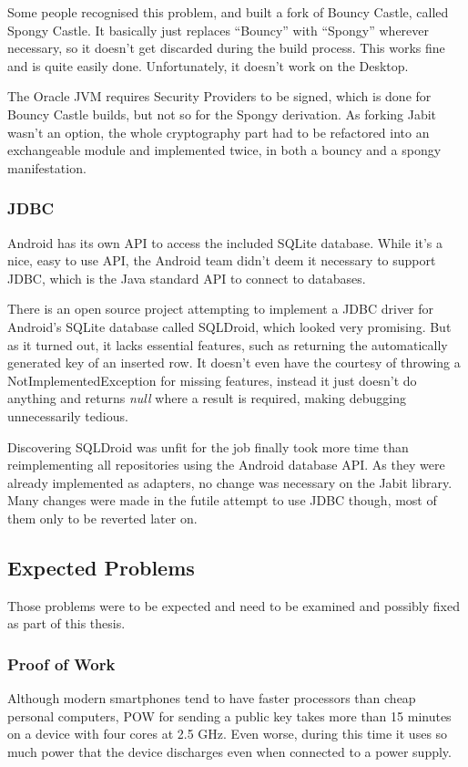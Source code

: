 \documentclass{bfh}
\begin{document}
  Some people recognised this problem, and built a fork of Bouncy Castle, called Spongy Castle. It basically just replaces “Bouncy” with “Spongy” wherever necessary, so it doesn’t get discarded during the build process. This works fine and is quite easily done. Unfortunately, it doesn’t work on the Desktop.

  The Oracle JVM requires Security Providers to be signed, which is done for Bouncy Castle builds, but not so for the Spongy derivation. As forking Jabit wasn’t an option, the whole cryptography part had to be refactored into an exchangeable module and implemented twice, in both a bouncy and a spongy manifestation.

  \subsubsection{JDBC}
  \label{subsec:jdbc}
  Android has its own API to access the included SQLite database. While it’s a nice, easy to use \ac{API}, the Android team didn’t deem it necessary to support \ac{JDBC}, which is the Java standard API to connect to databases.

  There is an open source project attempting to implement a \ac{JDBC} driver for Android’s SQLite database called SQLDroid, which looked very promising. But as it turned out, it lacks essential features, such as returning the automatically generated key of an inserted row. It doesn't even have the courtesy of throwing a NotImplementedException for missing features, instead it just doesn't do anything and returns \textit{null} where a result is required, making debugging unnecessarily tedious.\cite{github:sqldroid}

  Discovering SQLDroid was unfit for the job finally took more time than reimplementing all repositories using the Android database API. As they were already implemented as adapters, no change was necessary on the Jabit library. Many changes were made in the futile attempt to use JDBC though, most of them only to be reverted later on.

  \subsection{Expected Problems}
  Those problems were to be expected and need to be examined and possibly fixed as part of this thesis.

  \subsubsection{Proof of Work}
  Although modern smartphones tend to have faster processors than cheap personal computers, \ac{POW} for sending a public key takes more than 15 minutes on a device with four cores at 2.5 GHz. Even worse, during this time it uses so much power that the device discharges even when connected to a power supply.
\end{document}
